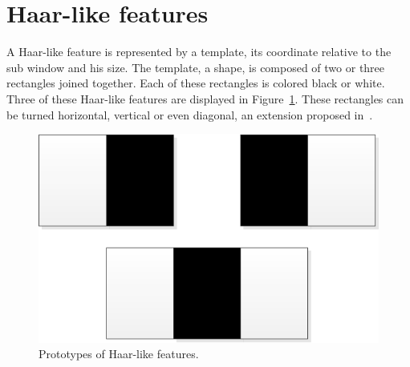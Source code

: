 \documentclass{article}
\begin{document}
%

\section{Haar-like features}

A Haar-like feature is represented by a template, its coordinate relative to the sub window and his size.
The template, a shape, is composed of two or three rectangles joined together. Each of these rectangles is colored black or white. Three of these Haar-like features are displayed in Figure~\ref{fig:features}. These rectangles can be turned horizontal, vertical or even  diagonal, an extension proposed in~\cite{lienhart2002extended}.

\begin{figure}[h!]
	\centering
	\includegraphics[scale=0.6]{Features.png}
	\caption{Prototypes of Haar-like features.}
	\label{fig:features}
\end{figure}
\end{document}
